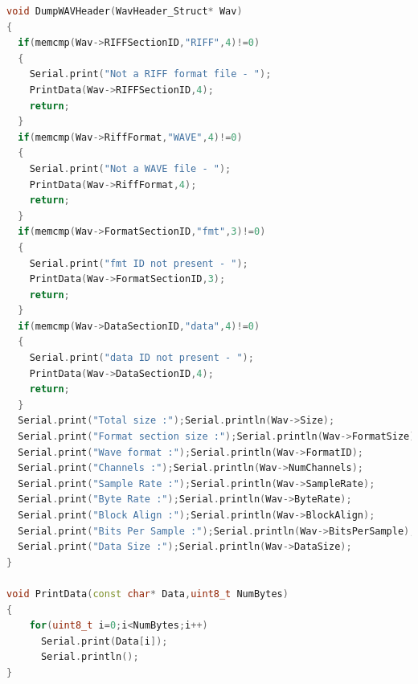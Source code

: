 \begin{lstlisting}[language=C++, basicstyle=\ttfamily\small, breaklines=true, frame=single]
void DumpWAVHeader(WavHeader_Struct* Wav)
{
  if(memcmp(Wav->RIFFSectionID,"RIFF",4)!=0)
  {
    Serial.print("Not a RIFF format file - ");    
    PrintData(Wav->RIFFSectionID,4);
    return;
  } 
  if(memcmp(Wav->RiffFormat,"WAVE",4)!=0)
  {
    Serial.print("Not a WAVE file - ");  
    PrintData(Wav->RiffFormat,4);  
    return;
  }  
  if(memcmp(Wav->FormatSectionID,"fmt",3)!=0)
  {
    Serial.print("fmt ID not present - ");
    PrintData(Wav->FormatSectionID,3);      
    return;
  } 
  if(memcmp(Wav->DataSectionID,"data",4)!=0)
  {
    Serial.print("data ID not present - "); 
    PrintData(Wav->DataSectionID,4);
    return;
  }  
  Serial.print("Total size :");Serial.println(Wav->Size);
  Serial.print("Format section size :");Serial.println(Wav->FormatSize);
  Serial.print("Wave format :");Serial.println(Wav->FormatID);
  Serial.print("Channels :");Serial.println(Wav->NumChannels);
  Serial.print("Sample Rate :");Serial.println(Wav->SampleRate);
  Serial.print("Byte Rate :");Serial.println(Wav->ByteRate);
  Serial.print("Block Align :");Serial.println(Wav->BlockAlign);
  Serial.print("Bits Per Sample :");Serial.println(Wav->BitsPerSample);
  Serial.print("Data Size :");Serial.println(Wav->DataSize);
}

void PrintData(const char* Data,uint8_t NumBytes)
{
    for(uint8_t i=0;i<NumBytes;i++)
      Serial.print(Data[i]); 
      Serial.println();  
}
\end{lstlisting}

\newpage

